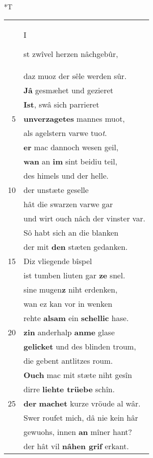 \documentclass[8pt,a4paper,notitlepage]{article}
\begin{document}
\begin{table}[ht]
\begin{minipage}[t]{0.5\linewidth}
\small
\begin{center}*T
\end{center}
\begin{tabular}{rl}
 & \begin{Large}I\end{Large}st zwîvel herzen nâchgebûr,\\ 
 & daz muoz der sêle werden sûr.\\ 
 & \textbf{Jâ} gesmæhet und gezieret\\ 
 & \textbf{Ist}, swâ sich parrieret\\ 
5 & \textbf{unverzagetes} mannes muot,\\ 
 & als agelstern varwe tuo\textit{t}.\\ 
 & \textbf{er} mac dannoch wesen geil,\\ 
 & \textbf{wan} an \textbf{im} sint beidiu teil,\\ 
 & des himels und der helle.\\ 
10 & der unstæte geselle\\ 
 & hât die swarzen varwe gar\\ 
 & und wirt ouch nâch der vinster var.\\ 
 & Sô habt sich an die blanken\\ 
 & der mit \textbf{den} stæten gedanken.\\ 
15 & Diz vliegende bîspel\\ 
 & ist tumben liuten gar \textbf{ze} snel.\\ 
 & sine mugen\textbf{z} niht erdenken,\\ 
 & wan ez kan vor in wenken\\ 
 & rehte \textbf{alsam} ein \textbf{schellic} hase.\\ 
20 & \textbf{zin} anderhalp \textbf{anme} glase\\ 
 & \textbf{gelicket} und des blinden troum,\\ 
 & die gebent antlitzes roum.\\ 
 & \textbf{Ouch} mac mit stæte niht gesîn\\ 
 & dirre \textbf{liehte trüebe} schîn.\\ 
25 & \textbf{der} \textbf{machet} kurze vröude al wâr.\\ 
 & Swer roufet mich, dâ nie kein hâr\\ 
 & gewuohs, innen \textbf{an} mîner hant?\\ 
 & der hât vil \textbf{nâhen grif} erkant.\\ 

\end{tabular}
\end{minipage}
\end{table}
\end{document}

